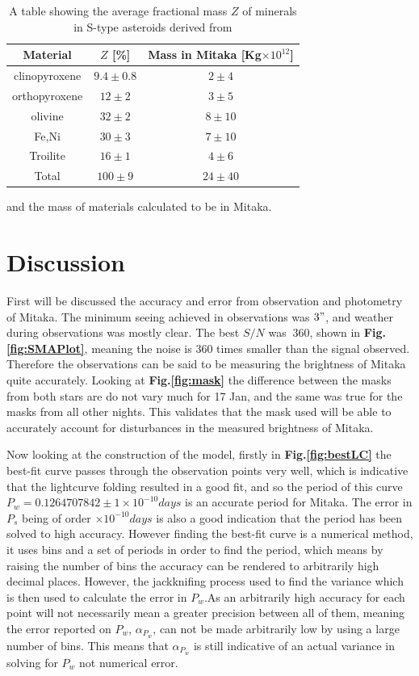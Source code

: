 \documentclass[10pt,twocolumn]{revtex4}    %
\newcommand{\reffig}[1]{\textbf{Fig.#1}}
\newcommand{\E}[1]{\times10^{#1}}
\newcommand{\err}[1]{\alpha_{#1}}
\begin{document}
\begin{table}[]
    \centering
    \begin{tabular}{c|c|c}
         Material & $Z$ [\%] & Mass in Mitaka [Kg$\times10^{12}$] \\ \hline
         clinopyroxene  & $9.4 \pm 0.8$    & $2 \pm 4$\\
         orthopyroxene  & $12 \pm 2$        & $3 \pm 5$\\
         olivine        & $32 \pm 2$        & $8 \pm 10$\\
         Fe,Ni          & $30 \pm 3$        & $7 \pm 10$\\
         Troilite        & $16 \pm 1$        & $4 \pm 6$\\
         Total          & $100 \pm 9$           & $24 \pm 40$\\
    \end{tabular}
    \caption{A table showing the average fractional mass $Z$ of minerals in S-type asteroids derived from \cite{sComp}} and the mass of materials calculated to be in Mitaka. 
    \label{tab:compTab}
\end{table}



\section{Discussion}\label{sec:discussion}
First will be discussed the accuracy and error from observation and photometry of Mitaka. The minimum seeing achieved in observations was $3"$, and weather during observations was mostly clear. The best $S/N$ was $~360$, shown in \reffig{\ref{fig:SMAPlot}}, meaning the noise is $360$ times smaller than the signal observed. Therefore the observations can be said to be measuring the brightness of Mitaka quite accurately. Looking at \reffig{\ref{fig:mask}} the difference between the masks from both stars are do not vary much for 17 Jan, and the same was true for the masks from all other nights. This validates that the mask used will be able to accurately account for disturbances in the measured brightness of Mitaka.

Now looking at the construction of the model, firstly in \reffig{\ref{fig:bestLC}} the best-fit curve passes through the observation points very well, which is indicative that the lightcurve folding resulted in a good fit, and so the period of this curve $P_w = 0.1264707842 \pm 1\times10^{-10}days$ is an accurate period for Mitaka. The error in $P_s$ being of order $\E{-10} days$ is also a good indication that the period has been solved to high accuracy. However finding the best-fit curve is a numerical method, it uses bins and a set of periods in order to find the period, which means by raising the number of bins the accuracy can be rendered to arbitrarily high decimal places. However, the jackknifing process used to find the variance which is then used to calculate the error in $P_w$.As an arbitrarily high accuracy for each point will not necessarily mean a greater precision between all of them, meaning the error reported on $P_w$, $\err{P_w}$, can not be made arbitrarily low by using a large number of bins. This means that $\err{P_w}$ is still indicative of an actual variance in solving for $P_w$ not numerical error. 
\end{document}
